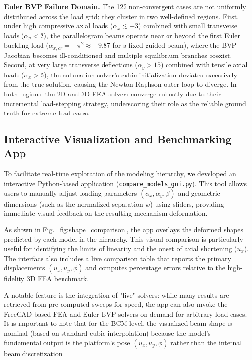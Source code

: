 \documentclass[colorlinks,upint,subscriptcorrection,varvw,hyphenate,balance]{asmeconf} %
\begin{document}
\textbf{Euler BVP Failure Domain.} The 122 non-convergent cases are not uniformly distributed across the load grid; they cluster in two well-defined regions. First, under high compressive axial loads ($\alpha_x \lesssim -3$) combined with small transverse loads ($\alpha_y < 2$), the parallelogram beams operate near or beyond the first Euler buckling load ($\alpha_{x,cr} = -\pi^2 \approx -9.87$ for a fixed-guided beam), where the BVP Jacobian becomes ill-conditioned and multiple equilibrium branches coexist. Second, at very large transverse deflections ($\alpha_y > 15$) combined with tensile axial loads ($\alpha_x > 5$), the collocation solver's cubic initialization deviates excessively from the true solution, causing the Newton-Raphson outer loop to diverge. In both regions, the 2D and 3D FEA solvers converge robustly due to their incremental load-stepping strategy, underscoring their role as the reliable ground truth for extreme load cases.

\subsection{Interactive Visualization and Benchmarking App}
To facilitate real-time exploration of the modeling hierarchy, we developed an interactive Python-based application (\texttt{compare\_models\_gui.py}). This tool allows users to manually adjust loading parameters $(\alpha_x, \alpha_y, \beta)$ and geometric dimensions (such as the normalized separation $w$) using sliders, providing immediate visual feedback on the resulting mechanism deformation. 

As shown in Fig.~\ref{fig:shape_comparison}, the app overlays the deformed shapes predicted by each model in the hierarchy. This visual comparison is particularly useful for identifying the limits of linearity and the onset of axial shortening ($u_x$). The interface also includes a live comparison table that reports the primary displacements $(u_x, u_y, \phi)$ and computes percentage errors relative to the high-fidelity 3D FEA benchmark. 

A notable feature is the integration of "live" solvers: while many results are retrieved from pre-computed sweeps for speed, the app can also invoke the FreeCAD-based FEA and Euler BVP solvers on-demand for arbitrary load cases. It is important to note that for the BCM level, the visualized beam shape is nominal (based on standard cubic interpolation) because the model's fundamental output is the platform's pose $(u_x, u_y, \phi)$ rather than the internal beam discretization. 
\end{document}
